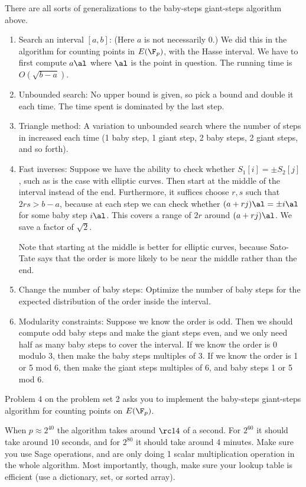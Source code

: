 There are all sorts of generalizations to the baby-steps giant-steps algorithm above. 
\begin{enumerate}
\item Search an interval $[a,b]$: (Here $a$ is not necessarily 0.)
We did this in the algorithm for counting points in $E(\F_p)$, with the Hasse interval. We have to first compute $a\al$ where $\al$ is the point in question. The running time is $O(\sqrt{b-a})$.
\item Unbounded search: No upper bound is given, so pick a bound and double it each time. The time spent is dominated by the last step.
\item Triangle method: A variation to unbounded search where the number of steps in increased each time (1 baby step, 1 giant step, 2 baby steps, 2 giant steps, and so forth).
\item Fast inverses: Suppose we have the ability to check whether $S_1[i]=\pm S_2[j]$, such as is the case with elliptic curves. Then start at the middle of the interval instead of the end. Furthermore, it suffices choose $r,s$ such that $2rs>b-a$, because at each step we can check whether $(a+rj)\al = \pm i\al$ for some baby step $i\al$. This covers a range of $2r$ around $(a+rj)\al$. We save a factor of $\sqrt 2$.

Note that starting at the middle is better for elliptic curves, because Sato-Tate says that the order is more likely to be near the middle rather than the end.
\item
Change the number of baby steps: Optimize the number of baby steps for the expected distribution of the order inside the interval.
\item Modularity constraints: Suppose we know the order is odd. Then we should compute odd baby steps and make the giant steps even, and we only need half as many baby steps to cover the interval. If we know the order is 0 modulo 3, then make the baby steps multiples of 3. If we know the order is 1 or 5 mod 6, then make the giant steps multiples of 6, and baby steps 1 or 5 mod 6.
\end{enumerate}
\begin{rem}
Problem 4 on the problem set 2 asks you to implement the baby-steps giant-steps algorithm for counting points on $E(\F_p)$. 

When $p\approx 2^{40}$ the algorithm takes around $\rc 14$ of a second. For $2^{60}$ it should take around $10$ seconds, and for $2^{80}$ it should take around 4 minutes. Make sure you use Sage operations, and are only doing 1 scalar multiplication operation in the whole algorithm. Most importantly, though, make sure your lookup table is efficient (use a dictionary, set, or sorted array).
\end{rem}
